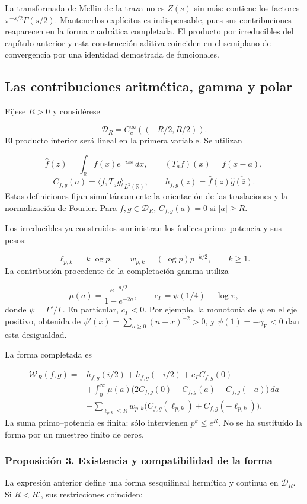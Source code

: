 La transformada de Mellin de la traza no es \(Z(s)\) sin más: contiene los factores \(\pi^{-s/2}\Gamma(s/2)\). Mantenerlos explícitos es indispensable, pues sus contribuciones reaparecen en la forma cuadrática completada. El producto por irreducibles del capítulo anterior y esta construcción aditiva coinciden en el semiplano de convergencia por una identidad demostrada de funcionales.

\subsection{Las contribuciones aritmética, gamma y polar}
Fíjese \(R>0\) y considérese

\[
\mathcal D_R=C_c^\infty((-R/2,R/2)).
\]
El producto interior será lineal en la primera variable. Se utilizan

\[
\widehat f(z)=\int_{\mathbb R}f(x)e^{-izx}\,dx,\qquad
(T_af)(x)=f(x-a),
\]
\[
C_{f,g}(a)=\langle f,T_ag\rangle_{L^2(\mathbb R)},\qquad
h_{f,g}(z)=\widehat f(z)\overline{\widehat g(\overline z)}.
\]
Estas definiciones fijan simultáneamente la orientación de las traslaciones y la normalización de Fourier. Para \(f,g\in\mathcal D_R\), \(C_{f,g}(a)=0\) si \(|a|\geq R\).

Los irreducibles ya construidos suministran los índices primo–potencia y sus pesos:

\[
\ell_{p,k}=k\log p,\qquad
w_{p,k}=(\log p)p^{-k/2},\qquad k\geq1.
\]
La contribución procedente de la completación gamma utiliza

\[
\mu(a)=\frac{e^{-a/2}}{1-e^{-2a}},\qquad
c_\Gamma=\psi(1/4)-\log\pi,
\]
donde \(\psi=\Gamma'/\Gamma\). En particular, \(c_\Gamma<0\). Por ejemplo, la monotonía de \(\psi\) en el eje positivo, obtenida de \(\psi'(x)=\sum_{n\geq0}(n+x)^{-2}>0\), y \(\psi(1)=-\gamma_{\mathrm E}<0\) dan esta desigualdad.

La forma completada es

\[
\begin{aligned}
\mathscr W_R(f,g)={}&h_{f,g}(i/2)+h_{f,g}(-i/2)
+c_\Gamma C_{f,g}(0)\\
&+\int_0^\infty\mu(a)
\bigl(2C_{f,g}(0)-C_{f,g}(a)-C_{f,g}(-a)\bigr)\,da\\
&-\sum_{\ell_{p,k}\leq R}w_{p,k}
\bigl(C_{f,g}(\ell_{p,k})+C_{f,g}(-\ell_{p,k})\bigr).
\end{aligned}
\]
La suma primo–potencia es finita: sólo intervienen \(p^k\leq e^R\). No se ha sustituido la forma por un muestreo finito de ceros.

\subsubsection*{Proposición 3. Existencia y compatibilidad de la forma}
La expresión anterior define una forma sesquilineal hermítica y continua en \(\mathcal D_R\). Si \(R<R'\), sus restricciones coinciden:

